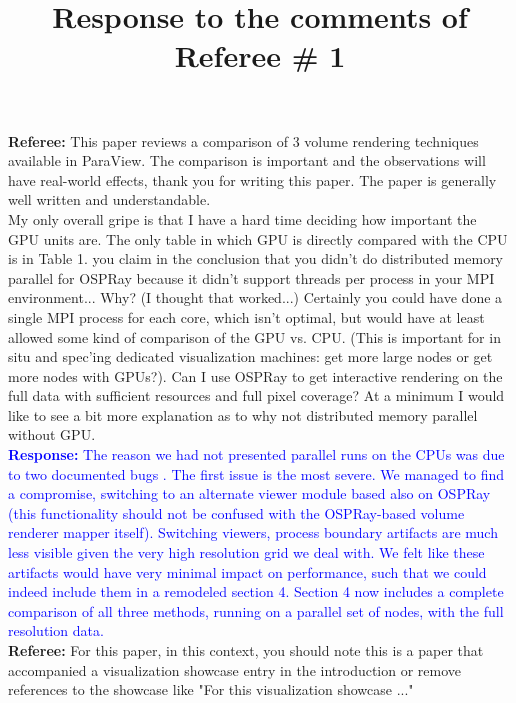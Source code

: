 \documentclass[]{article}
\title{Response to the comments of Referee \# 1}
\begin{document}
\maketitle
\textbf{Referee:} This paper reviews a comparison of 3 volume rendering techniques available in ParaView. The comparison is important and the observations will have real-world effects, thank you for writing this paper. The paper is generally well written and understandable. \\

My only overall gripe is that I have a hard time deciding how important the GPU units are. The only table in which GPU is directly compared with the CPU is in Table 1. you claim in the conclusion that you didn't do distributed memory parallel for OSPRay because it didn't support threads per process in your MPI environment... Why? (I thought that worked...) Certainly you could have done a single MPI process for each core, which isn't optimal, but would have at least allowed some kind of comparison of the GPU vs. CPU.  (This is important for in situ and spec'ing dedicated visualization machines: get more large nodes or get more nodes with GPUs?). Can I use OSPRay to get interactive rendering on the full data with sufficient resources and full pixel coverage? At a minimum I would like to see a bit more explanation as to why not distributed memory parallel without GPU.\\

\textcolor{blue}{\textbf{Response:} The reason we had not presented parallel runs on the CPUs was due to two documented bugs \cite{issue1, issue2}. The first issue is the most severe. We managed to find a compromise, switching to an alternate viewer module based also on OSPRay (this functionality should not be confused with the OSPRay-based volume renderer mapper itself). Switching viewers, process boundary artifacts are much less visible given the very high resolution grid we deal with. We felt like these artifacts would have very minimal impact on performance, such that we could indeed include them in a remodeled section 4. Section 4 now includes a complete comparison of all three methods, running on a parallel set of nodes, with the full resolution data.} \\

\textbf{Referee:} For this paper, in this context, you should note this is a paper that accompanied a visualization showcase entry in the introduction or remove references to the showcase like "For this visualization showcase ..." \\
\end{document}
